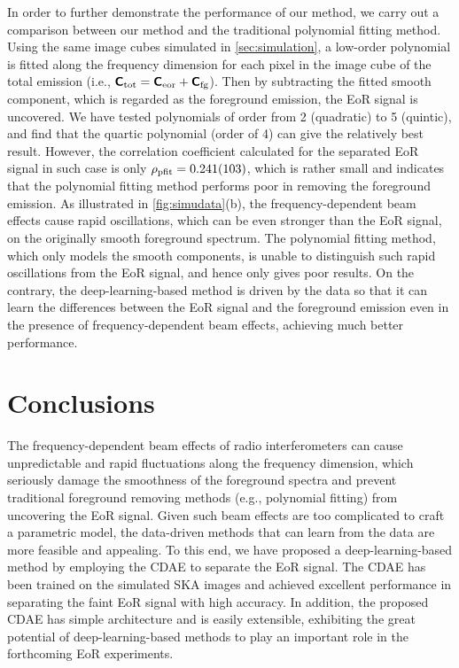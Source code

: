 \documentclass[letters,a4paper,fleqn,usenatbib]{mnras}
\newcommand{\R}[1]{\mathrm{#1}}
\newcommand{\M}[1]{\mathbfss{#1}}
\begin{document}
In order to further demonstrate the performance of our method, we carry
out a comparison between our method and the traditional polynomial
fitting method.
Using the same image cubes simulated in \autoref{sec:simulation},
a low-order polynomial is fitted along the frequency dimension for each
pixel in the image cube of the total emission (i.e.,
$\M{C}_{\R{tot}} = \M{C}_{\R{eor}} + \M{C}_{\R{fg}}$).
Then by subtracting the fitted smooth component, which is regarded as
the foreground emission, the EoR signal is uncovered.
We have tested polynomials of order from 2 (quadratic) to 5 (quintic),
and find that the quartic polynomial (order of 4) can give the
relatively best result.
However, the correlation coefficient calculated for the separated EoR
signal in such case is only $\rho_{\R{pfit}} = \num{0.241 +- 0.103}$,
which is rather small and indicates that the polynomial fitting method
performs poor in removing the foreground emission.
As illustrated in \autoref{fig:simudata}(b), the frequency-dependent
beam effects cause rapid oscillations, which can be even stronger than
the EoR signal, on the originally smooth foreground spectrum.
The polynomial fitting method, which only models the smooth components,
is unable to distinguish such rapid oscillations from the EoR signal,
and hence only gives poor results.
On the contrary, the deep-learning-based method is driven by the data
so that it can learn the differences between the EoR signal and the
foreground emission even in the presence of frequency-dependent beam
effects, achieving much better performance.


\section{Conclusions}
\label{sec:conclusions}

The frequency-dependent beam effects of radio interferometers can cause
unpredictable and rapid fluctuations along the frequency dimension,
which seriously damage the smoothness of the foreground spectra and
prevent traditional foreground removing methods (e.g., polynomial
fitting) from uncovering the EoR signal.
Given such beam effects are too complicated to craft a parametric
model, the data-driven methods that can learn from the data are more
feasible and appealing.
To this end, we have proposed a deep-learning-based method by employing
the CDAE to separate the EoR signal.
The CDAE has been trained on the simulated SKA images and achieved
excellent performance in separating the faint EoR signal with high
accuracy.
In addition, the proposed CDAE has simple architecture and is easily
extensible, exhibiting the great potential of deep-learning-based
methods to play an important role in the forthcoming EoR experiments.
\end{document}
